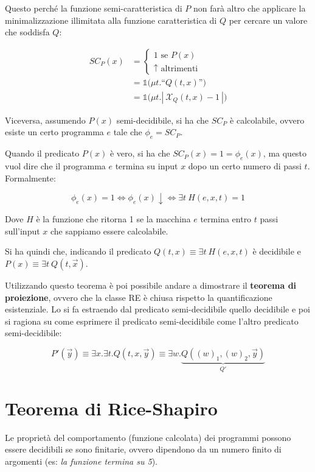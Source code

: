 Questo perché la funzione semi-caratteristica di $P$ non farà altro che applicare la minimalizzazione illimitata alla funzione caratteristica di $Q$ per cercare un valore che soddisfa $Q$:

\begin{align*}
	SC_P(x) &= \begin{cases}
		1 \text{ se } P(x)\\
		\uparrow \text{ altrimenti}
	\end{cases} \\
	&= \mathbb{1} \bigg( \mu t. \text{``} Q(t,x)\text{''} \bigg) \\
	&= \mathbb{1} \bigg( \mu t. | \: \mathcal{X}_Q(t,x) - 1 \: | \bigg)
\end{align*}

Viceversa, assumendo $P(x)$ semi-decidibile, si ha che $SC_P$ è calcolabile, ovvero esiste un certo programma $e$ tale che $\phi_e = SC_P$.

Quando il predicato $P(x)$ è vero, si ha che $SC_P(x) = 1 = \phi_e(x)$, ma questo vuol dire che il programma $e$ termina su input $x$ dopo un certo numero di passi $t$. Formalmente:

$$
\phi_e(x) = 1 \Leftrightarrow \phi_e(x) \downarrow \Leftrightarrow \exists t \: H(e,x,t) = 1
$$

Dove $H$ è la funzione che ritorna 1 se la macchina $e$ termina entro $t$ passi sull'input $x$ che sappiamo essere calcolabile.

Si ha quindi che, indicando il predicato $Q(t,x) \equiv \exists t \: H(e,x,t)$ è decidibile e $P(x) \equiv \exists t \: Q(t,\vec{x})$.

Utilizzando questo teorema è poi possibile andare a dimostrare il \textbf{teorema di proiezione}, ovvero che la classe RE è chiusa rispetto la quantificazione esistenziale. Lo si fa estraendo dal predicato semi-decidibile quello decidibile e poi si ragiona su come esprimere il predicato semi-decidibile come l'altro predicato semi-decidibile:

 $$
 P'(\vec{y}) \equiv \exists x.\exists t . Q(t,x, \vec{y}) \equiv \exists w . \underbrace{Q((w)_1, (w)_2, \vec{y})}_{Q'}
 $$



\section{Teorema di Rice-Shapiro}

Le proprietà del comportamento (funzione calcolata) dei programmi possono essere decidibili se sono finitarie, ovvero dipendono da un numero finito di argomenti (es: \textit{la funzione termina su 5}).


